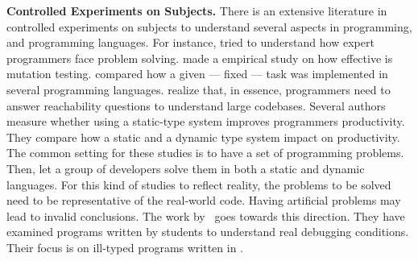 \textbf{Controlled Experiments on Subjects.}
There is an extensive literature \perse{} in controlled experiments on subjects to understand several aspects in programming, and programming languages.
For instance, \cite{solowayEmpiricalStudiesProgramming1984} tried to understand how expert programmers face problem solving.
\cite{buddTheoreticalEmpiricalStudies1980} made a empirical study on how effective is mutation testing.
\cite{precheltEmpiricalComparisonSeven2000} compared how a given --- fixed --- task was implemented in several programming languages.
%
\cite{latozaDevelopersAskReachability2010} realize that, in essence, programmers need to answer reachability questions to understand large codebases.
%
Several authors~\cite{stuchlikStaticVsDynamic2011,mayerEmpiricalStudyInfluence2012,harlinImpactUsingStaticType2017} measure whether using a static-type system improves programmers productivity.
They compare how a static and a dynamic type system impact on productivity.
The common setting for these studies is to have a set of programming problems.
Then, let a group of developers solve them in both a static and dynamic languages.
%
For this kind of studies to reflect reality, the problems to be solved need to be representative of the real-world code.
Having artificial problems may lead to invalid conclusions.
The work by~\cite{wuHowTypeErrors2017,wuLearningUserFriendly2017} goes towards this direction. 
They have examined programs written by students to understand real debugging conditions. 
Their focus is on ill-typed programs written in \haskell{}.

